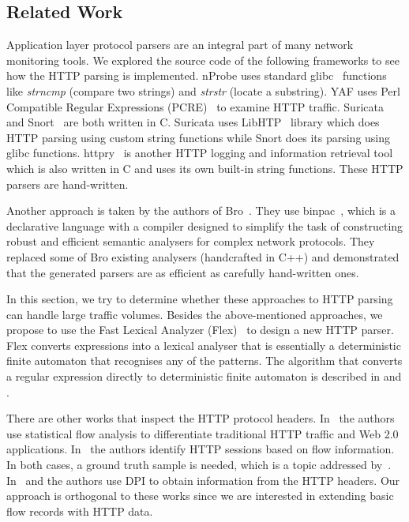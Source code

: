 \subsection{Related Work} \label{subsec:http-related_work}

Application layer protocol parsers are an integral part of many network monitoring tools. We explored the source code of the following frameworks to see how the HTTP parsing is implemented. nProbe uses standard glibc~\cite{GNUProject-2017-GNU} functions like \emph{strncmp} (compare two strings) and \emph{strstr} (locate a substring). YAF uses Perl Compatible Regular Expressions (PCRE)~\cite{Hazel-2015-PCRE} to examine HTTP traffic. Suricata~\cite{OISF-2017-Suricata} and Snort~\cite{Roesch-1999-Snort} are both written in C. Suricata uses LibHTP~\cite{Qualys-2017-LibHTP} library which does HTTP parsing using custom string functions while Snort does its parsing using glibc functions. httpry~\cite{Bittel-2014-httpry} is another HTTP logging and information retrieval tool which is also written in C and uses its own built-in string functions. These HTTP parsers are hand-written.

Another approach is taken by the authors of Bro~\cite{Paxson-1999-Bro}. They use binpac~\cite{Pang-2006-binpac}, which is a declarative language with a compiler designed to simplify the task of constructing robust and efficient semantic analysers for complex network protocols. They replaced some of Bro existing analysers (handcrafted in C++) and demonstrated that the generated parsers are as efficient as carefully hand-written ones.

In this section, we try to determine whether these approaches to HTTP parsing can handle large traffic volumes. Besides the above-mentioned approaches, we propose to use the Fast Lexical Analyzer (Flex)~\cite{Levine-2009-Flex} to design a new HTTP parser. Flex converts expressions into a lexical analyser that is essentially a deterministic finite automaton that recognises any of the patterns. The algorithm that converts a regular expression directly to deterministic finite automaton is described in \cite{Lesk-1975-Lex} and \cite{McNaughton-1960-Regular}.

There are other works that inspect the HTTP protocol headers. In~\cite{Schneider-2008-new} the authors use statistical flow analysis to differentiate traditional HTTP traffic and Web 2.0 applications. In~\cite{Torres-2012-Identifying} the authors identify HTTP sessions based on flow information. In both cases, a ground truth sample is needed, which is a topic addressed by~\cite{Torres-2012-Strategies}. In~\cite{Gehlen-2012-Uncovering} and \cite{Mahanti-2011-Characterizing} the authors use DPI to obtain information from the HTTP headers. Our approach is orthogonal to these works since we are interested in extending basic flow records with HTTP data.

